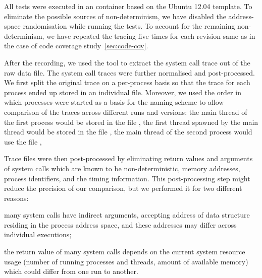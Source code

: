 All tests were executed in an \lxc container based on the Ubuntu 12.04
template.  To eliminate the possible sources of non-determinism, we have
disabled the address-space randomisation while running the tests. To account
for the remaining non-determinism, we have repeated the tracing five times for
each revision same as in the case of code coverage study~\ref{sec:code-cov}.

After the recording, we used the  tool to extract the system call
trace out of the raw data file. The system call traces were further normalised
and post-processed. We first split the original trace on a per-process basis so
that the trace for each process ended up stored in an individual file.
Moreover, we used the order in which processes were started as a basis for the
naming scheme to allow comparison of the traces across different runs and
versions: the main thread of the first process would be stored in the file
, the first thread spawned by the main thread would be
stored in the file , the main thread of the second
process would use the file , \etc


Trace files were then post-processed by eliminating return values and arguments
of system calls which are known to be non-deterministic, \ie memory addresses,
process identifiers, and the timing information. This post-processing step
might reduce the precision of our comparison, but we performed it for two
different reasons:%
\begin{inparaenum}[(1)]
\item many system calls have indirect arguments, accepting address of data
  structure residing in the process address space, and these addresses may
  differ across individual executions;
\item the return value of many system calls depends on the current system
  resource usage (\eg number of running processes and threads, amount of
  available memory) which could differ from one run to another.
\end{inparaenum}

